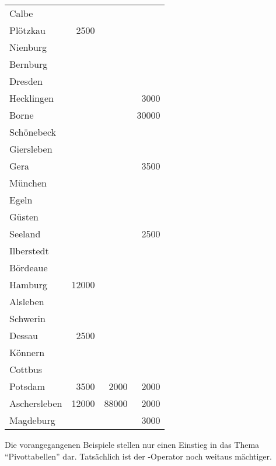 \begin{center}
    \begin{small}
        \tablehead{}
        \begin{oraclesql}
            \begin{supertabular}{lrrr}
                Calbe &  &  &  \\
                Plötzkau & 2500 &  &  \\
                Nienburg &  &  &  \\
                Bernburg &  &  &  \\
                Dresden &  &  &  \\
                Hecklingen &  &  & 3000 \\
                Borne &  &  & 30000 \\
                Schönebeck &  &  &  \\
                Giersleben &  &  &  \\
                Gera &  &  & 3500 \\
                München &  &  &  \\
                Egeln &  &  &  \\
                Güsten &  &  &  \\
                Seeland &  &  & 2500 \\
                Ilberstedt &  &  &  \\
                Bördeaue &  &  &  \\
                Hamburg & 12000 &  &  \\
                Alsleben &  &  &  \\
                Schwerin &  &  &  \\
                Dessau & 2500 &  &  \\
                Könnern &  &  &  \\
                Cottbus &  &  &  \\
                Potsdam & 3500 & 2000 & 2000 \\
                Aschersleben & 12000 & 88000 & 2000 \\
                Magdeburg &  &  & 3000 \\
            \end{supertabular}
        \end{oraclesql}
    \end{small}
\end{center}
Die vorangegangenen Beispiele stellen nur einen Einstieg in das Thema \enquote{Pivottabellen} dar. Tatsächlich ist der -Operator noch weitaus mächtiger.
\clearpage
